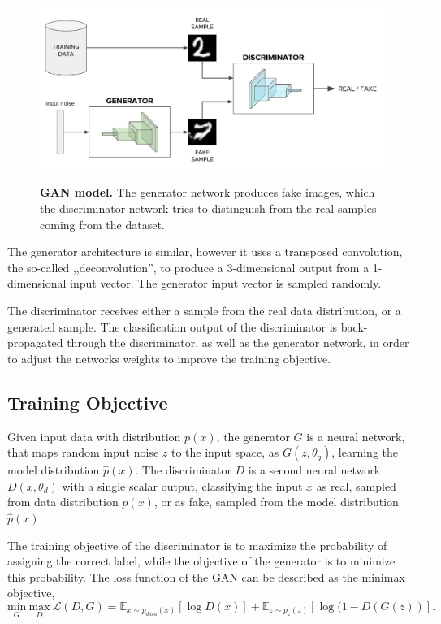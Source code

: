 \documentclass[12pt]{report}
\begin{document}
\begin{figure}[h]
\centering
{\includegraphics[width=\linewidth]{02_background/gan_model}}
\caption{\label{fig:gan} \textbf{GAN model.} The generator network produces fake images, which the discriminator network tries to distinguish from the real samples coming from the dataset.}
\end{figure}

The generator architecture is similar, however it uses a transposed convolution, the so-called ,,deconvolution'', to produce a 3-dimensional output from a 1-dimensional input vector. The generator input vector is sampled randomly.

The discriminator receives either a sample from the real data distribution, or a generated sample. The classification output of the discriminator is back-propagated  through the discriminator, as well as the generator network, in order to adjust the networks weights to improve the training objective.

\subsection{Training Objective} \label{sec:GAN_training}

Given input data with distribution $p(x)$, the generator $G$ is a neural network, that maps random input noise $z$ to the input space, as $G(z, \theta_{g})$, learning the model distribution $\hat{p}(x)$. The discriminator $D$ is a second neural network $D(x, \theta_{d})$ with a single scalar output, classifying the input $x$ as real, sampled from data distribution $p(x)$, or as fake, sampled from the model distribution $\hat{p}(x)$. 

The training objective of the discriminator is to maximize the probability of assigning the correct label, while the objective of the generator is to minimize this probability. The loss function of the GAN can be described as the minimax objective,
\begin{equation}
\underset{G}{\mathrm{min}} \ \underset{D}{\mathrm{max}} \ \mathcal{L}(D,G) = \mathbb{E}_{x \sim p_{data}(x)}[\log D(x)] + \mathbb{E}_{z \sim p_{z}(z)}[\log (1 - D(G(z))].
\label{eq:minimax}
\end{equation}
\end{document}
